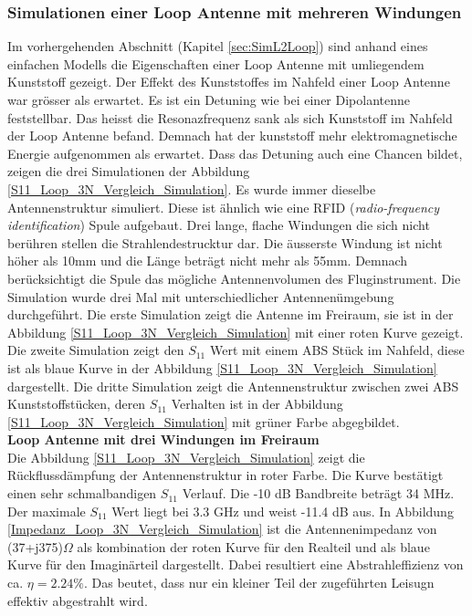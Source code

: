 \subsubsection{Simulationen einer Loop Antenne mit mehreren Windungen}
Im vorhergehenden Abschnitt (Kapitel \ref{sec:SimL2Loop}) sind anhand eines einfachen Modells die Eigenschaften einer Loop Antenne mit umliegendem Kunststoff gezeigt. Der Effekt des Kunststoffes im Nahfeld einer Loop Antenne war grösser als erwartet. Es ist ein Detuning wie bei einer Dipolantenne feststellbar. Das heisst die Resonazfrequenz sank als sich Kunststoff im Nahfeld der Loop Antenne befand. Demnach hat der kunststoff mehr elektromagnetische Energie aufgenommen als erwartet. Dass das Detuning auch eine Chancen bildet, zeigen die drei Simulationen der Abbildung \ref{S11_Loop_3N_Vergleich_Simulation}. Es wurde immer dieselbe Antennenstruktur simuliert. Diese ist ähnlich wie eine RFID (\textit{radio-frequency identification}) Spule aufgebaut. Drei lange, flache Windungen die sich nicht berühren stellen die Strahlendestrucktur dar. Die äusserste Windung ist nicht höher als 10mm und die Länge beträgt nicht mehr als 55mm. Demnach  berücksichtigt die Spule das mögliche Antennenvolumen des Fluginstrument. Die Simulation wurde drei Mal mit unterschiedlicher Antennenümgebung durchgeführt. Die erste Simulation zeigt die Antenne im Freiraum, sie ist in der Abbildung \ref{S11_Loop_3N_Vergleich_Simulation} mit einer roten Kurve gezeigt. Die zweite Simulation zeigt den $S_{11}$ Wert mit einem ABS Stück im Nahfeld, diese ist als blaue Kurve in der Abbildung \ref{S11_Loop_3N_Vergleich_Simulation} dargestellt. Die dritte Simulation zeigt die Antennenstruktur zwischen zwei ABS Kunststoffstücken, deren $S_{11}$ Verhalten ist in der Abbildung \ref{S11_Loop_3N_Vergleich_Simulation} mit grüner Farbe abgegbildet.\\

\textbf{Loop Antenne mit drei Windungen im Freiraum}\\
Die Abbildung \ref{S11_Loop_3N_Vergleich_Simulation} zeigt die Rückflussdämpfung der Antennenstruktur in roter Farbe. Die Kurve bestätigt  einen sehr schmalbandigen $S_{11}$ Verlauf. Die -10 dB Bandbreite beträgt 34 MHz. Der maximale $S_{11}$ Wert liegt bei 3.3 GHz und weist -11.4 dB aus. In Abbildung \ref{Impedanz_Loop_3N_Vergleich_Simulation} ist die Antennenimpedanz von (37+j375)$\Omega$ als kombination der roten Kurve für den Realteil und als blaue Kurve für den Imaginärteil dargestellt. Dabei resultiert eine Abstrahleffizienz von ca. $\eta=2.24\%$. Das beutet, dass nur ein kleiner Teil der zugeführten Leisugn effektiv abgestrahlt wird.\\

